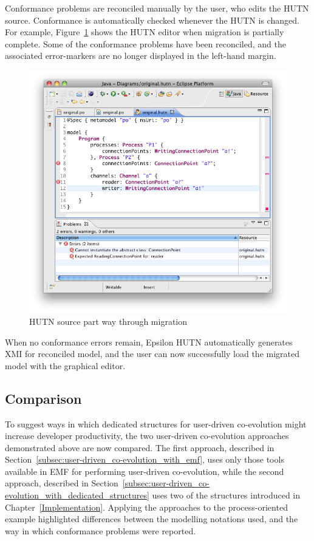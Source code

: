 Conformance problems are reconciled manually by the user, who edits the HUTN source. Conformance is automatically checked whenever the HUTN is changed. For example, Figure~\ref{fig:po_hutn_partial} shows the HUTN editor when migration is partially complete. Some of the conformance problems have been reconciled, and the associated error-markers are no longer displayed in the left-hand margin.

\begin{figure}[htbp]
  \centering
  \includegraphics[width=12.75cm]{6.Evaluation/images/user_driven/po_hutn_partial.png}
  \caption{HUTN source part way through migration}
  \label{fig:po_hutn_partial}
\end{figure}

When no conformance errors remain, Epsilon HUTN automatically generates XMI for reconciled model, and the user can now successfully load the migrated model with the graphical editor.

\subsection{Comparison}
\label{subsec:user_driven_example_comparison}
To suggest ways in which dedicated structures for user-driven co-evolution might increase developer productivity, the two user-driven co-evolution approaches demonstrated above are now compared. The first approach, described in Section~\ref{subsec:user-driven_co-evolution_with_emf}, uses only those tools available in EMF for performing user-driven co-evolution, while the second approach, described in Section~\ref{subsec:user-driven_co-evolution_with_dedicated_structures} uses two of the structures introduced in Chapter~\ref{Implementation}. Applying the approaches to the process-oriented example highlighted differences between the modelling notations used, and the way in which conformance problems were reported.

